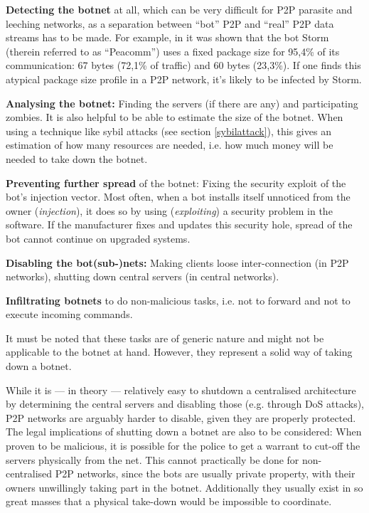 \documentclass{llncs}
\begin{document}
\begin{description}
\item {\bf Detecting the botnet} at all, which can be very difficult for P2P
  parasite and leeching networks, as a separation between ``bot'' P2P
  and ``real'' P2P data streams has to be made. For example, in
  \cite{steggink2007detection} it was shown that the bot Storm
  (therein referred to as ``Peacomm'') uses a fixed package size for
  95,4\% of its communication: 67 bytes (72,1\% of traffic) and 60 bytes
  (23,3\%). If one finds this atypical package size profile in a P2P
  network, it's likely to be infected by Storm.
\item {\bf Analysing the botnet:} Finding the servers (if there are any) and
  participating zombies. It is also helpful to be able to estimate the
  size of the botnet. When using a technique like sybil attacks (see
  section \ref{sybilattack}), this gives an estimation of how many resources
  are needed, i.e. how much money will be needed to take down the
  botnet.
\item {\bf Preventing further spread} of the botnet: Fixing the security
  exploit of the bot's injection vector. Most often, when a bot
  installs itself unnoticed from the owner ({\it injection}), it does so by
  using ({\it exploiting}) a security problem in the software. If the
  manufacturer fixes and updates this security hole, spread of the bot
  cannot continue on upgraded systems.
\item {\bf Disabling the bot(sub-)nets:} Making clients loose
  inter-connection (in P2P networks), shutting down central servers
  (in central networks).
\item {\bf Infiltrating botnets} to do non-malicious tasks, i.e. not to
  forward and not to execute incoming commands.
\end{description}

It must be noted that these tasks are of generic nature and might not
be applicable to the botnet at hand. However, they represent a solid
way of taking down a botnet.

While it is --- in theory --- relatively easy to shutdown a
centralised architecture by determining the central servers and
disabling those (e.g. through DoS attacks), P2P networks are arguably
harder to disable, given they are properly protected. The legal
implications of shutting down a botnet are also to be considered: When
proven to be malicious, it is possible for the police to get a warrant
to cut-off the servers physically from the net. This cannot
practically be done for non-centralised P2P networks, since the bots
are usually private property, with their owners unwillingly taking
part in the botnet. Additionally they usually exist in so great masses that a
physical take-down would be impossible to coordinate.
\end{document}

